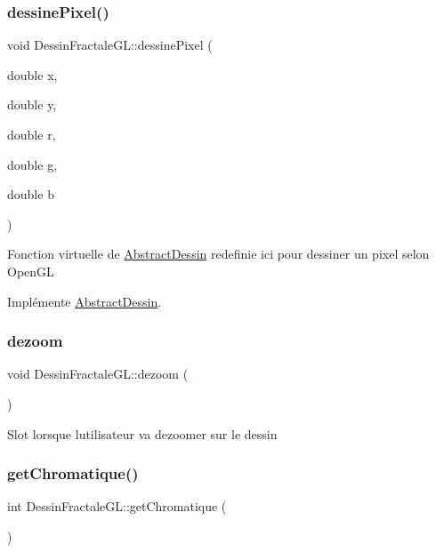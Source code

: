 \subsubsection{\texorpdfstring{dessine\+Pixel()}{dessinePixel()}}
{\footnotesize\ttfamily void Dessin\+Fractale\+G\+L\+::dessine\+Pixel (\begin{DoxyParamCaption}\item[{double}]{x,  }\item[{double}]{y,  }\item[{double}]{r,  }\item[{double}]{g,  }\item[{double}]{b }\end{DoxyParamCaption})\hspace{0.3cm}{\ttfamily [virtual]}}

Fonction virtuelle de \hyperlink{classAbstractDessin}{Abstract\+Dessin} redefinie ici pour dessiner un pixel selon Open\+GL 

Implémente \hyperlink{classAbstractDessin_a82983d17a63c236c5ca8f4966195ffe3}{Abstract\+Dessin}.

\mbox{\label{classDessinFractaleGL_ac3eee50451126a4df2476ee86157457a}} 
\subsubsection{\texorpdfstring{dezoom}{dezoom}}
{\footnotesize\ttfamily void Dessin\+Fractale\+G\+L\+::dezoom (\begin{DoxyParamCaption}{ }\end{DoxyParamCaption})\hspace{0.3cm}{\ttfamily [slot]}}

Slot lorsque l\textquotesingle{}utilisateur va dezoomer sur le dessin \mbox{\label{classDessinFractaleGL_a942a7d978d67fa83885c3b92929e4a7e}} 
\subsubsection{\texorpdfstring{get\+Chromatique()}{getChromatique()}}
{\footnotesize\ttfamily int Dessin\+Fractale\+G\+L\+::get\+Chromatique (\begin{DoxyParamCaption}{ }\end{DoxyParamCaption})}

